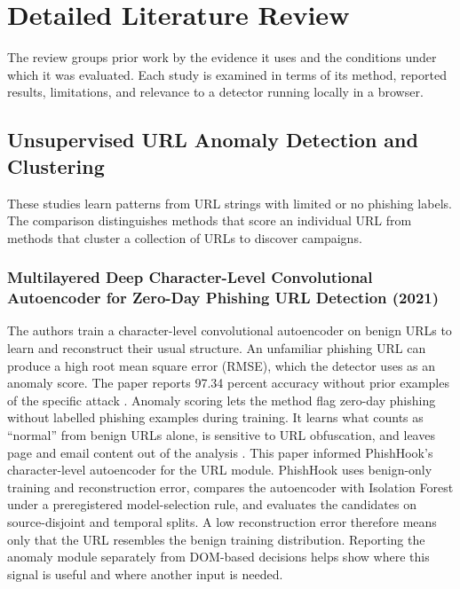 \documentclass{FastFyp}
\begin{document}
\section{Detailed Literature Review}
\label{sec:litreview}
The review groups prior work by the evidence it uses and the conditions under which it was evaluated. Each study is examined in terms of its method, reported results, limitations, and relevance to a detector running locally in a browser.

\subsection{Unsupervised URL Anomaly Detection and Clustering}
These studies learn patterns from URL strings with limited or no phishing labels. The comparison distinguishes methods that score an individual URL from methods that cluster a collection of URLs to discover campaigns.

\subsubsection{Multilayered Deep Character-Level Convolutional Autoencoder for Zero-Day Phishing URL Detection (2021)}
The authors train a character-level convolutional autoencoder on benign URLs to learn and reconstruct their usual structure. An unfamiliar phishing URL can produce a high root mean square error (RMSE), which the detector uses as an anomaly score. The paper reports 97.34 percent accuracy without prior examples of the specific attack \cite{charcnn2021}. Anomaly scoring lets the method flag zero-day phishing without labelled phishing examples during training. It learns what counts as ``normal'' from benign URLs alone, is sensitive to URL obfuscation, and leaves page and email content out of the analysis \cite{charcnn2021}. This paper informed PhishHook's character-level autoencoder for the URL module. PhishHook uses benign-only training and reconstruction error, compares the autoencoder with Isolation Forest under a preregistered model-selection rule, and evaluates the candidates on source-disjoint and temporal splits. A low reconstruction error therefore means only that the URL resembles the benign training distribution. Reporting the anomaly module separately from DOM-based decisions helps show where this signal is useful and where another input is needed.
\end{document}
